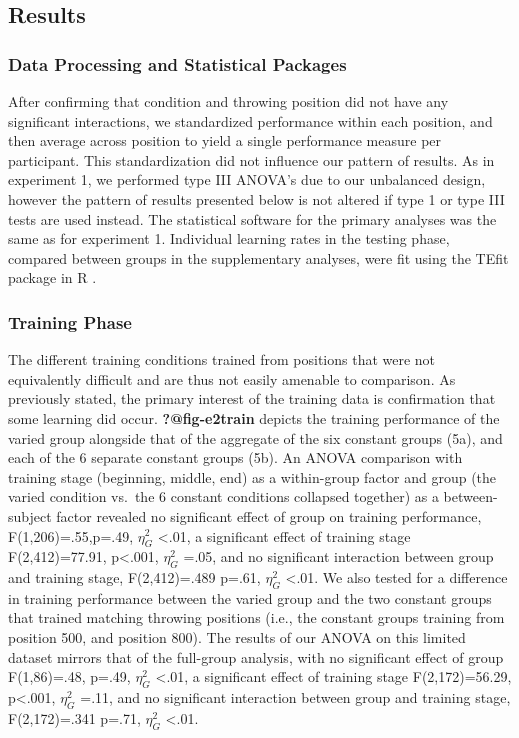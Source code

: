 \documentclass[
  12pt,
  letterpaper,
]{article}
\begin{document}
\subsection{Results}\label{results-1}

\subsubsection{Data Processing and Statistical
Packages}\label{data-processing-and-statistical-packages-1}

After confirming that condition and throwing position did not have any
significant interactions, we standardized performance within each
position, and then average across position to yield a single performance
measure per participant. This standardization did not influence our
pattern of results. As in experiment 1, we performed type III ANOVA's
due to our unbalanced design, however the pattern of results presented
below is not altered if type 1 or type III tests are used instead. The
statistical software for the primary analyses was the same as for
experiment 1. Individual learning rates in the testing phase, compared
between groups in the supplementary analyses, were fit using the TEfit
package in R \autocite{cochraneTEfitsNonlinearRegression2020}.

\subsubsection{Training Phase}\label{training-phase-1}

The different training conditions trained from positions that were not
equivalently difficult and are thus not easily amenable to comparison.
As previously stated, the primary interest of the training data is
confirmation that some learning did occur. \textbf{?@fig-e2train}
depicts the training performance of the varied group alongside that of
the aggregate of the six constant groups (5a), and each of the 6
separate constant groups (5b). An ANOVA comparison with training stage
(beginning, middle, end) as a within-group factor and group (the varied
condition vs.~the 6 constant conditions collapsed together) as a
between-subject factor revealed no significant effect of group on
training performance, F(1,206)=.55,p=.49, \(\eta^{2}_G\) \textless.01, a
significant effect of training stage F(2,412)=77.91, p\textless.001,
\(\eta^{2}_G\) =.05, and no significant interaction between group and
training stage, F(2,412)=.489 p=.61, \(\eta^{2}_G\) \textless.01. We
also tested for a difference in training performance between the varied
group and the two constant groups that trained matching throwing
positions (i.e., the constant groups training from position 500, and
position 800). The results of our ANOVA on this limited dataset mirrors
that of the full-group analysis, with no significant effect of group
F(1,86)=.48, p=.49, \(\eta^{2}_G\) \textless.01, a significant effect of
training stage F(2,172)=56.29, p\textless.001, \(\eta^{2}_G\) =.11, and
no significant interaction between group and training stage,
F(2,172)=.341 p=.71, \(\eta^{2}_G\) \textless.01.
\end{document}
